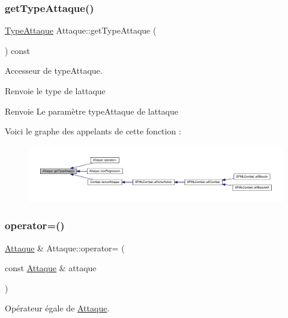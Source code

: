 \subsubsection{\texorpdfstring{get\+Type\+Attaque()}{getTypeAttaque()}}
{\footnotesize\ttfamily \hyperlink{_attaque_8h_acefba67470a7a2e69ed731d28d318e64}{Type\+Attaque} Attaque\+::get\+Type\+Attaque (\begin{DoxyParamCaption}{ }\end{DoxyParamCaption}) const}



Accesseur de type\+Attaque. 

Renvoie le type de l\textquotesingle{}attaque \begin{DoxyReturn}{Renvoie}
Le paramètre type\+Attaque de l\textquotesingle{}attaque 
\end{DoxyReturn}
Voici le graphe des appelants de cette fonction \+:\nopagebreak
\begin{figure}[H]
\begin{center}
\leavevmode
\includegraphics[width=350pt]{class_attaque_acb25c596d5b90b2330d3188749bc130d_icgraph}
\end{center}
\end{figure}
\mbox{\label{class_attaque_a21b14fe41db692f8e38aa1821a3519b9}} 
\subsubsection{\texorpdfstring{operator=()}{operator=()}}
{\footnotesize\ttfamily \hyperlink{class_attaque}{Attaque} \& Attaque\+::operator= (\begin{DoxyParamCaption}\item[{const \hyperlink{class_attaque}{Attaque} \&}]{attaque }\end{DoxyParamCaption})}



Opérateur égale de \hyperlink{class_attaque}{Attaque}. 

